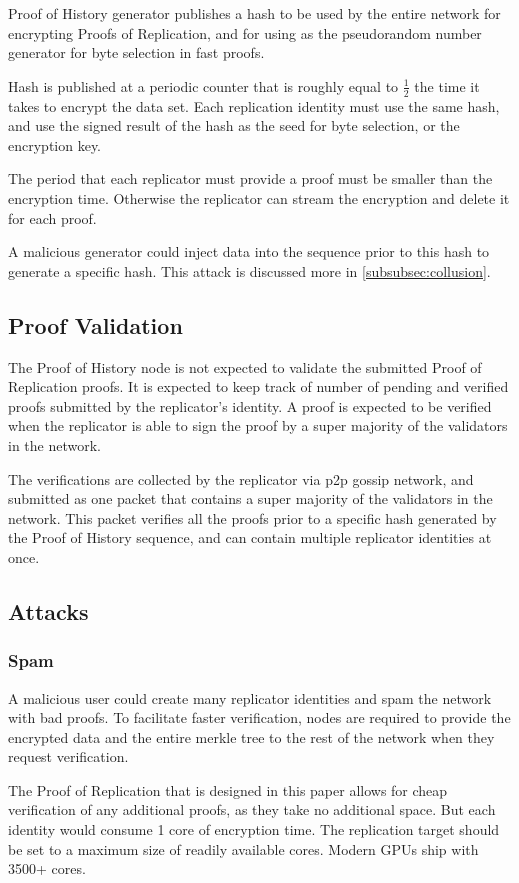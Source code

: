 \documentclass[12pt]{ltjsarticle}
\begin{document}
Proof of History generator publishes a hash to be used by the entire network for encrypting Proofs of Replication, and for using as the pseudorandom number generator for byte selection in fast proofs.

Hash is published at a periodic counter that is roughly equal to \(\frac{1}{2}\) the time it takes to encrypt the data set. Each replication identity must use the same hash, and use the signed result of the hash as the seed for byte selection, or the encryption key.

The period that each replicator must provide a proof must be smaller than the encryption time. Otherwise the replicator can stream the encryption and delete it for each proof.

A malicious generator could inject data into the sequence prior to this hash to generate a specific hash. This attack is discussed more in \ref{subsubsec:collusion}.

\subsection{Proof Validation}
The Proof of History node is not expected to validate the submitted Proof of Replication proofs. It is expected to keep track of number of pending and verified proofs submitted by the replicator’s identity. A proof is expected to be verified when the replicator is able to sign the proof by a super majority of the validators in the network.

The verifications are collected by the replicator via p2p gossip network, and submitted as one packet that contains a super majority of the validators in the network. This packet verifies all the proofs prior to a specific hash generated by the Proof of History sequence, and can contain multiple replicator identities at once.
\subsection{Attacks}
\subsubsection{Spam}
A malicious user could create many replicator identities and spam the network with bad proofs. To facilitate faster verification, nodes are required to provide the encrypted data and the entire merkle tree to the rest of the network when they request verification.

The Proof of Replication that is designed in this paper allows for cheap verification of any additional proofs, as they take no additional space. But each identity would consume 1 core of encryption time. The replication target should be set to a maximum size of readily available cores. Modern GPUs ship with 3500+ cores.
\end{document}
